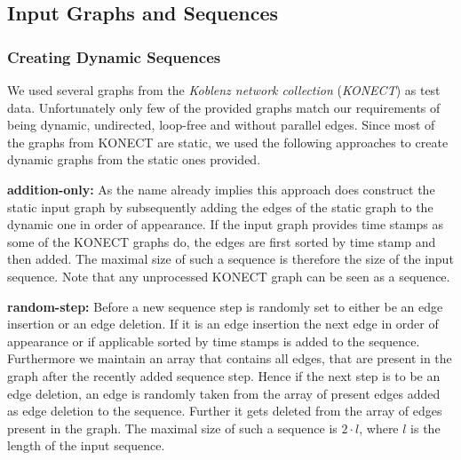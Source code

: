 \documentclass{article}      %
\begin{document}
\subsection{Input Graphs and Sequences}
\label{sec:inps-seqs}

\subsubsection{Creating Dynamic Sequences}
\label{sec:dyn-seqs}

We used several graphs from the \emph{Koblenz network collection} (\emph{KONECT}) as test data. Unfortunately only few of the provided graphs match our requirements of being dynamic, undirected, loop-free and without parallel edges. Since most of the graphs from KONECT are static, we used the following approaches to create dynamic graphs from the static ones provided. 


\bigskip \noindent
\textbf{addition-only:} As the name already implies this approach does construct the static input graph by subsequently adding the edges of the static graph to the dynamic one in order of appearance. If the input graph provides time stamps as some of the KONECT graphs do, the edges are first sorted by time stamp and then added. The maximal size of such a sequence is therefore the size of the input sequence. Note that any unprocessed KONECT graph can be seen as a sequence.

\bigskip \noindent
\textbf{random-step:} Before a new sequence step is randomly set to either be an edge insertion or an edge deletion. If it is an edge insertion the next edge in order of appearance or if applicable sorted by time stamps is added to the sequence. Furthermore we maintain an array that contains all edges, that are present in the graph after the recently added sequence step. Hence if the next step is to be an edge deletion, an edge is randomly taken from the array of present edges added as edge deletion to the sequence. Further it gets deleted from the array of edges present in the graph. The maximal size of such a sequence is $2 \cdot l$, where $l$ is the length of the input sequence.
\end{document}
